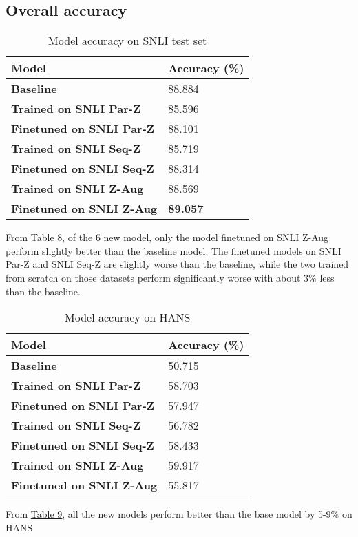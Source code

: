 \documentclass{article}
\begin{document}
\subsection{Overall accuracy}

\begin{table}[H]
\label{table8}
\caption{Model accuracy on SNLI test set}
\centering
\begin{tabular}{l l}
\hline
\textbf{Model}                   & \textbf{Accuracy (\%)} \\ \hline
\textbf{Baseline}                & 88.884                 \\
\textbf{Trained on SNLI Par-Z}   & 85.596                 \\
\textbf{Finetuned on SNLI Par-Z} & 88.101                 \\
\textbf{Trained on SNLI Seq-Z}   & 85.719                 \\
\textbf{Finetuned on SNLI Seq-Z} & 88.314                 \\
\textbf{Trained on SNLI Z-Aug}   & 88.569                 \\
\textbf{Finetuned on SNLI Z-Aug} & \textbf{89.057}                 \\ \hline
\end{tabular}
\end{table}

From \hyperref[table8]{Table 8}, of the 6 new model, only the model finetuned on SNLI Z-Aug perform slightly better than the baseline model.
The finetuned models on SNLI Par-Z and SNLI Seq-Z are slightly worse than the baseline, while the two trained from scratch on those datasets perform significantly worse with about 3\% less than the baseline.

\begin{table}[H]
    \label{table9}
    \caption{Model accuracy on HANS}
\centering
\begin{tabular}{l l}
\hline
\textbf{Model}                   & \textbf{Accuracy (\%)} \\ \hline
\textbf{Baseline}                & 50.715                 \\
\textbf{Trained on SNLI Par-Z}   & 58.703                 \\
\textbf{Finetuned on SNLI Par-Z} & 57.947                 \\
\textbf{Trained on SNLI Seq-Z}   & 56.782                 \\
\textbf{Finetuned on SNLI Seq-Z} & 58.433                 \\
\textbf{Trained on SNLI Z-Aug}   & 59.917                 \\
\textbf{Finetuned on SNLI Z-Aug} & 55.817                 \\ \hline
\end{tabular}

\end{table}
From \hyperref[table9]{Table 9}, all the new models perform better than the base model by 5-9\% on HANS
\end{document}
